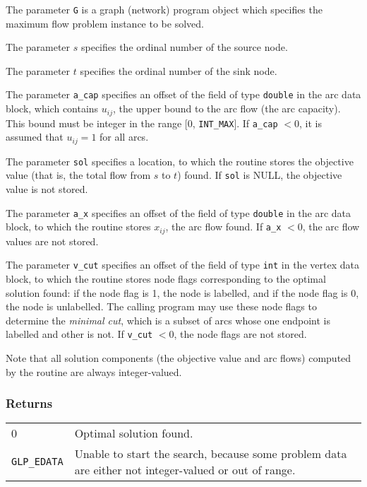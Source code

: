 \documentclass[dvipdfm,11pt]{report}
\begin{document}
The parameter \verb|G| is a graph (network) program object which
specifies the maximum flow problem instance to be solved.

The parameter $s$ specifies the ordinal number of the source node.

The parameter $t$ specifies the ordinal number of the sink node.

The parameter \verb|a_cap| specifies an offset of the field of type
\verb|double| in the arc data block, which contains $u_{ij}$, the upper
bound to the arc flow (the arc capacity). This bound must be integer in
the range [0, \verb|INT_MAX|]. If \verb|a_cap| $<0$, it is assumed that
$u_{ij}=1$ for all arcs.

The parameter \verb|sol| specifies a location, to which the routine
stores the objective value (that is, the total flow from $s$ to $t$)
found. If \verb|sol| is NULL, the objective value is not stored.

The parameter \verb|a_x| specifies an offset of the field of type
\verb|double| in the arc data block, to which the routine stores
$x_{ij}$, the arc flow found. If \verb|a_x| $<0$, the arc flow values
are not stored.

The parameter \verb|v_cut| specifies an offset of the field of type
\verb|int| in the vertex data block, to which the routine stores node
flags corresponding to the optimal solution found: if the node flag is
1, the node is labelled, and if the node flag is 0, the node is
unlabelled. The calling program may use these node flags to determine
the {\it minimal cut}, which is a subset of arcs whose one endpoint is
labelled and other is not. If \verb|v_cut| $<0$, the node flags are not
stored.

Note that all solution components (the objective value and arc flows)
computed by the routine are always integer-valued.

\subsubsection*{Returns}

\def\arraystretch{1}

\begin{tabular}{@{}p{25mm}p{97.3mm}@{}}
0 & Optimal solution found.\\
\verb|GLP_EDATA| & Unable to start the search, because some problem
data are either not integer-valued or out of range.\\
\end{tabular}
\end{document}
